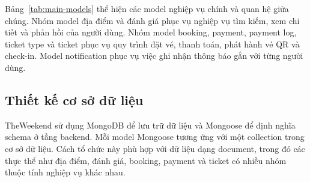 ﻿\documentclass[../DoAn.tex]{subfiles}
\begin{document}
Bảng~\ref{tab:main-models} thể hiện các model nghiệp vụ chính và quan hệ giữa chúng. Nhóm model địa điểm và đánh giá phục vụ nghiệp vụ tìm kiếm, xem chi tiết và phản hồi của người dùng. Nhóm model booking, payment, payment log, ticket type và ticket phục vụ quy trình đặt vé, thanh toán, phát hành vé QR và check-in. Model notification phục vụ việc ghi nhận thông báo gắn với từng người dùng.

\subsection{Thiết kế cơ sở dữ liệu}

TheWeekend sử dụng MongoDB để lưu trữ dữ liệu và Mongoose để định nghĩa schema ở tầng backend. Mỗi model Mongoose tương ứng với một collection trong cơ sở dữ liệu. Cách tổ chức này phù hợp với dữ liệu dạng document, trong đó các thực thể như địa điểm, đánh giá, booking, payment và ticket có nhiều nhóm thuộc tính nghiệp vụ khác nhau.
\end{document}
